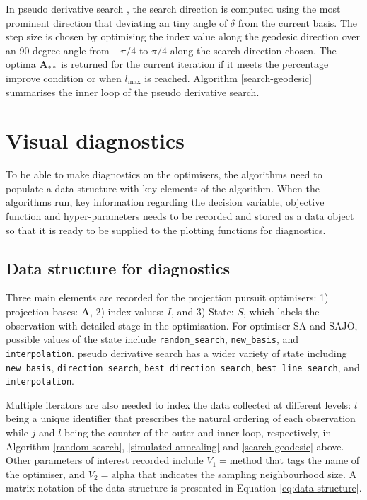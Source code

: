 In pseudo derivative search \citep{cook1995grand}, the search direction
is computed using the most prominent direction that deviating an tiny
angle of \(\delta\) from the current basis. The step size is chosen by
optimising the index value along the geodesic direction over an 90
degree angle from \(-\pi/4\) to \(\pi/4\) along the search direction
chosen. The optima \(\mathbf{A}_{**}\) is returned for the current
iteration if it meets the percentage improve condition or when
\(l_{\max}\) is reached. Algorithm \ref{search-geodesic} summarises the
inner loop of the pseudo derivative search.

\hypertarget{vis-diag}{%
\section{Visual diagnostics}\label{vis-diag}}

To be able to make diagnostics on the optimisers, the algorithms need to
populate a data structure with key elements of the algorithm. When the
algorithms run, key information regarding the decision variable,
objective function and hyper-parameters needs to be recorded and stored
as a data object so that it is ready to be supplied to the plotting
functions for diagnostics.

\hypertarget{data-structure-for-diagnostics}{%
\subsection{Data structure for
diagnostics}\label{data-structure-for-diagnostics}}

Three main elements are recorded for the projection pursuit optimisers:
1) projection bases: \(\mathbf{A}\), 2) index values: \(I\), and 3)
State: \(S\), which labels the observation with detailed stage in the
optimisation. For optimiser SA and SAJO, possible values of the state
include \texttt{random\_search}, \texttt{new\_basis}, and
\texttt{interpolation}. pseudo derivative search has a wider variety of
state including \texttt{new\_basis}, \texttt{direction\_search},
\texttt{best\_direction\_search}, \texttt{best\_line\_search}, and
\texttt{interpolation}.

Multiple iterators are also needed to index the data collected at
different levels: \(t\) being a unique identifier that prescribes the
natural ordering of each observation while \(j\) and \(l\) being the
counter of the outer and inner loop, respectively, in Algorithm
\ref{random-search}, \ref{simulated-annealing} and \ref{search-geodesic}
above. Other parameters of interest recorded include
\(V_1 = \text{method}\) that tags the name of the optimiser, and
\(V_2 = \text{alpha}\) that indicates the sampling neighbourhood size. A
matrix notation of the data structure is presented in Equation
\ref{eq:data-structure}.

